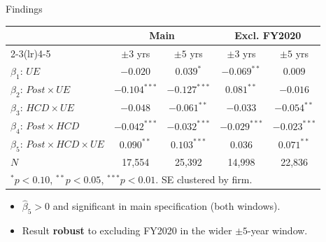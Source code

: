 \documentclass[aspectratio=169]{beamer}
\begin{document}
\begin{frame}{Findings}

\begin{center}
{\small
\begin{tabular}{lcccc}
\toprule
 & \multicolumn{2}{c}{\textbf{Main}} & \multicolumn{2}{c}{\textbf{Excl. FY2020}} \\
\cmidrule(lr){2-3}\cmidrule(lr){4-5}
 & $\pm 3$ yrs & $\pm 5$ yrs & $\pm 3$ yrs & $\pm 5$ yrs \\
\midrule
$\beta_1$: $UE$                            & $-0.020$       & $0.039^{*}$    & $-0.069^{**}$  & $0.009$ \\
$\beta_2$: $Post \times UE$                & $-0.104^{***}$ & $-0.127^{***}$ & $0.081^{**}$   & $-0.016$ \\
$\beta_3$: $HCD \times UE$                 & $-0.048$       & $-0.061^{**}$  & $-0.033$       & $-0.054^{**}$ \\
$\beta_4$: $Post \times HCD$               & $-0.042^{***}$ & $-0.032^{***}$ & $-0.029^{***}$ & $-0.023^{***}$ \\
\midrule
$\beta_5$: $Post \times HCD \times UE$     & $\bm{0.090^{**}}$ & $\bm{0.103^{***}}$ & $0.036$ & $\bm{0.071^{**}}$ \\
\midrule
$N$                                        & 17{,}554 & 25{,}392 & 14{,}998 & 22{,}836 \\
\bottomrule
\multicolumn{5}{l}{{\scriptsize $^{*}p<0.10$, $^{**}p<0.05$, $^{***}p<0.01$. SE clustered by firm.}}
\end{tabular}}
\end{center}

\vspace{4pt}

\begin{itemize}
  \item $\hat{\beta}_5 > 0$ and significant in main specification (both windows).
  \item Result \textbf{robust} to excluding FY2020 in the wider $\pm 5$-year window.
\end{itemize}

\end{frame}
\end{document}
